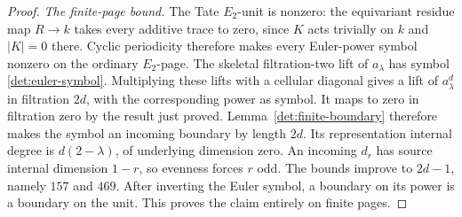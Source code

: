 \begin{proof}
\emph{The finite-page bound.}
The Tate \(E_2\)-unit is nonzero: the equivariant residue map
\(R\to k\) takes every additive trace to zero, since \(K\)
acts trivially on \(k\) and \(|K|=0\) there.  Cyclic
periodicity therefore makes every Euler-power symbol nonzero
on the ordinary \(E_2\)-page.
The skeletal filtration-two lift of \(a_\lambda\) has
symbol \eqref{det:euler-symbol}.
Multiplying these lifts with a cellular diagonal gives
a lift of \(a_\lambda^d\) in filtration \(2d\), with the
corresponding power as symbol.
It maps to zero in filtration zero by the result just proved.
Lemma~\ref{det:finite-boundary} therefore makes the symbol
an incoming boundary by length \(2d\).
Its representation internal degree is \(d(2-\lambda)\),
of underlying dimension zero.
An incoming \(d_r\) has source internal dimension \(1-r\),
so evenness forces \(r\) odd.
The bounds improve to \(2d-1\), namely \(157\) and \(469\).
After inverting the Euler symbol, a boundary on its power
is a boundary on the unit.  This proves the claim entirely
on finite pages.
\end{proof}

